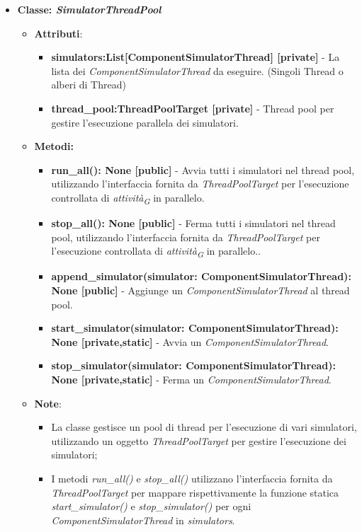 \begin{itemize}
\begin{itemize}
\begin{itemize}
\begin{itemize}
            \item 
        \end{itemize}
    \end{itemize}
    \item{\textbf{Classe: \textit{SimulatorThreadPool}}}
    \begin{itemize}
    \item\textbf{Attributi}:
        \begin{itemize}
        \item \textbf{simulators:List[ComponentSimulatorThread] [private]} - La lista dei \textit{ComponentSimulatorThread} da eseguire. (Singoli Thread o alberi di Thread)
        \item \textbf{thread\_pool:ThreadPoolTarget [private]} - Thread pool per gestire l'esecuzione parallela dei simulatori.
    \end{itemize}
    \item \textbf{Metodi: }
    \begin{itemize}
        \item \textbf{run\_all(): None [public]} - Avvia tutti i simulatori nel thread pool, utilizzando l'interfaccia fornita da \textit{ThreadPoolTarget} per l'esecuzione controllata di \textit{attività}\textsubscript{\textit{G}} in parallelo.
        \item \textbf{stop\_all(): None [public]} - Ferma tutti i simulatori nel thread pool, utilizzando l'interfaccia fornita da \textit{ThreadPoolTarget} per l'esecuzione controllata di \textit{attività}\textsubscript{\textit{G}} in parallelo..
        \item \textbf{append\_simulator(simulator: ComponentSimulatorThread): None [public]} - Aggiunge un \textit{ComponentSimulatorThread} al thread pool.
        \item \textbf{start\_simulator(simulator: ComponentSimulatorThread): None [private,static]} - Avvia un \textit{ComponentSimulatorThread}.
        \item \textbf{stop\_simulator(simulator: ComponentSimulatorThread): None [private,static]} - Ferma un \textit{ComponentSimulatorThread}.
    \end{itemize}
    \item\textbf{Note}:
        \begin{itemize}
            \item La classe gestisce un pool di thread per l'esecuzione di vari simulatori, utilizzando un oggetto \textit{ThreadPoolTarget} per gestire l'esecuzione dei simulatori;
            \item I metodi \textit{run\_all()} e \textit{stop\_all()} utilizzano l'interfaccia fornita da \textit{ThreadPoolTarget} per mappare rispettivamente la funzione statica \textit{start\_simulator()} e \textit{stop\_simulator()} per ogni \textit{ComponentSimulatorThread} in \textit{simulators}.

\end{itemize}
\end{itemize}
\end{itemize}
\end{itemize}
